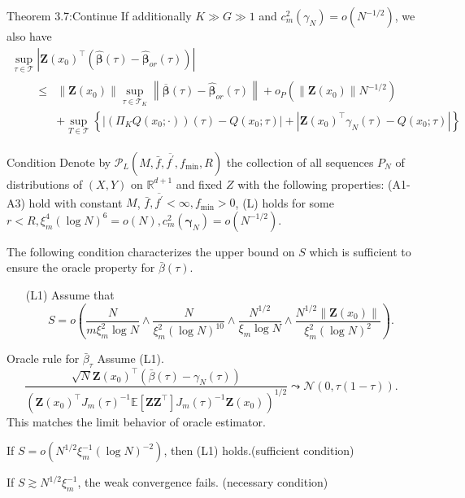 \documentclass[11pt]{beamer}
\begin{document}
\begin{frame}{Theorem 3.7:Continue}
If additionally $K \gg G\gg 1$ and $c_{m}^{2}\left(\gamma_{N}\right)=o\left(N^{-1 / 2}\right)$, we also have
$$
\begin{array}{l}
\sup _{\tau \in \mathcal{T}}\left|\mathbf{Z}\left(x_{0}\right)^{\top}\left(\widehat{\boldsymbol{\beta}}(\tau)-\widehat{\boldsymbol{\beta}}_{o r}(\tau)\right)\right| \\
\qquad \begin{aligned}
\leq &\left\|\mathbf{Z}\left(x_{0}\right)\right\| \sup _{\tau \in \mathcal{T}_{K}}\left\|\overline{\boldsymbol{\beta}}(\tau)-\widehat{\boldsymbol{\beta}}_{o r}(\tau)\right\|+o_{P}\left(\left\|\mathbf{Z}\left(x_{0}\right)\right\| N^{-1 / 2}\right) \\
&+\sup _{T \in \mathcal{T}}\left\{\left|\left(\Pi_{K} Q\left(x_{0} ; \cdot\right)\right)(\tau)-Q\left(x_{0} ; \tau\right)\right|+\left|\mathbf{Z}\left(x_{0}\right)^{\top} \gamma_{N}(\tau)-Q\left(x_{0} ; \tau\right)\right|\right\}
\end{aligned}
\end{array}
$$
\end{frame}





\begin{frame}{Condition}
Denote by $\mathcal{P}_{L}\left(M, \bar{f}, \overline{f^{\prime}}, f_{\min }, R\right)$ the collection of all sequences $P_N$ of distributions of $(X,Y)$ on $\mathbb{R}^{d+1}$ and fixed $Z$ with the following properties: (A1-A3) hold with constant $M$, $\bar{f}, \overline{f^{\prime}}<\infty, f_{\min}>0$, (L) holds for some $r<R,\xi_{m}^{4}(\log N)^{6}=o(N),c_{m}^{2}\left(\boldsymbol{\gamma}_{N}\right)=o\left(N^{-1 / 2}\right)$.

The following condition characterizes the upper bound on $S$ which is sufficient to ensure the oracle property for $\bar{\beta}(\tau)$. 
\begin{itemize}
\item[(L1)] Assume that
$$
S=o\left(\frac{N}{m \xi_{m}^{2} \log N} \wedge \frac{N}{\xi_{m}^{2}(\log N)^{10}} \wedge \frac{N^{1 / 2}}{\xi_{m} \log N} \wedge \frac{N^{1 / 2}\left\|\mathbf{Z}\left(x_{0}\right)\right\|}{\xi_{m}^{2}(\log N)^{2}}\right).
$$
\end{itemize}
\end{frame}

\begin{frame}{Oracle rule for $\bar{\beta}_{\tau}$ }
Assume (L1).
$$
\frac{\sqrt{N} \mathbf{Z}\left(x_{0}\right)^{\top}\left(\bar{\beta}(\tau)-\gamma_{N}(\tau)\right)}{\left(\mathbf{Z}\left(x_{0}\right)^{\top} J_{m}(\tau)^{-1} \mathbb{E}\left[\mathbf{Z} \mathbf{Z}^{\top}\right] J_{m}(\tau)^{-1} \mathbf{Z}\left(x_{0}\right)\right)^{1 / 2}} \leadsto \mathcal{N}(0, \tau(1-\tau)).
$$
This matches the limit behavior of oracle estimator. 

If $S=o(N^{1/2}\xi_m^{-1}(\log N)^{-2})$, then (L1) holds.(sufficient condition)

If $S\gtrsim N^{1/2}\xi_m^{-1}$, the weak convergence fails. (necessary condition)
\end{frame}
\end{document}
